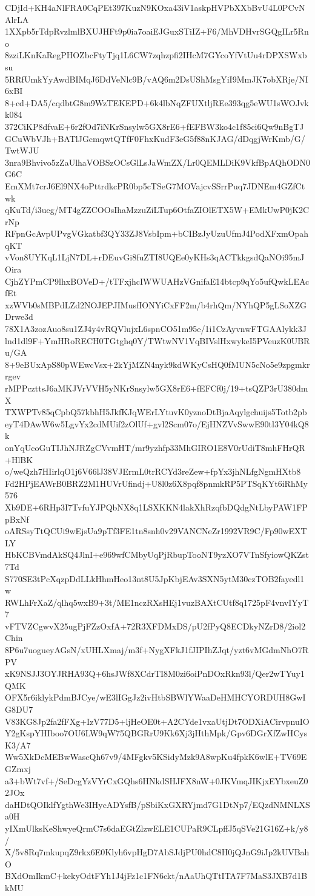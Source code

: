 CDjId+KH4aNlFRA0CqPEt397KuzN9KOxa43iV1askpHVPbXXbBvU4L0PCvNAlrLA
1XXpb5rTdpRvzlmlBXUJHFt9p0ia7oaiEJGuxSTiIZ+F6/MhVDHvrSGQgILr5Rno
8zziLKnKaRegPHOZbcFtyTjq1L6CW7zqhzpfi2IHcM7GYcoYfVtUu4rDPXSWxbsu
5RRfUmkYyAwdBIMqJ6DdVeNlc9B/vAQ6m2DsUShMsgYiI9MmJK7obXRje/NI6xBI
8+cd+DA5/cqdbtG8m9WzTEKEPD+6k4lbNqZFUXtljREe393qg5eWU1sWOJvkk084
372CiKP8dfvaE+6r2fOd7iNKrSnsylw5GX8rE6+fEFBW3ko4c1f85ci6Qw9nBgTJ
GCuWbVJh+BATlJGcmqwtQTfF0FhxKudF3eG5f88nKJAG/dDqgjWrKmb/G/TwtWJU
3nra9Bhvivo5zZaUlhaVOBSzOCsGlLsJaWmZX/Lr0QEMLDiK9VkfBpAQhODN0G6C
EmXMt7crJ6El9NX4oPttrdkcPR0bp5cTSeG7MOVajcvSSrrPuq7JDNEm4GZfCtwk
qKuTd/i3ueg/MT4gZZCOOsIhaMzzuZiLTup6OtfaZIOlETX5W+EMkUwP0jK2CrNp
RFpnGcAvpUPvgVGkatbf3QY33ZJ8VsbIpm+bCIBzJyUzuUfmJ4PodXFxmOpahqKT
vVon8UYKqL1LjN7DL+rDEuvGi8fuZTI8UQEe0yKHs3qACTkkgsdQaNOi95mJOira
CjhZYPmCP9lhxBOVeD+/tTFxjhcIWWUAHzVGnifaE14btcp9qYo5ufQwkLEAcfEt
xzWVb0sMBPdLZd2NOJEPJIMusfIONYiCxFF2m/b4rhQm/NYhQP5gLSoXZGDrwe3d
78X1A3zozAuo8su1ZJ4y4vRQVlujxL6spnCO51m95e/1i1CzAyvnwFTGAAlykk3J
lnd1dl9F+YmHRoRECH0TGtghq0Y/TWtwNV1VqBIVslHxwykeI5PVeuzK0UBRu/GA
8+9eBUxApS80pWEwcVsx+2kYjMZN4nyk9kdWKyCsHQ0fMUN5cNo5e9zpgmkrrgev
rMPPczttsJ6aMKJVrVVH5yNKrSnsylw5GX8rE6+fEFCf0j/19+tsQZP3rU380dmX
TXWPTv85qCpbQ57kbhH5JkfKJqWErLYtuvK0yznoDtBjaAqylgchuijs5Totb2pb
eyT4DAwW6w5LgvYx2cdMUif2zOlUf+gvl2Scm07o/EjHNZVvSwwE90tl3Y04kQ8k
onYqUcoGuTIJhNJRZgCVvmHT/mr9yzhfp33MhGIRO1E8V0rUdiT8mhFHrQR+HlBK
o/weQzh7HIirlqO1j6V66lJ38VJErmL0trRCYd3reZew+fpYx3jhNLfgNgmHXtb8
Fd2HPjEAWrB0BRZ2M1HUVrUfindj+U8l0z6X8pqf8pnmkRP5PTSqKYt6iRhMy576
Xb9DE+6RHp3I7TvfuYJPQbNX8q1LSXKKN4lakXhRzqfbDQdgNtLbyPAW1FPpBxNf
oARSsyTtQCUi9wEjsUa9pTf3FE1tn8snh0v29VANCNeZr1992VR9C/Fp90wEXTLY
HbKCBVmdAkSQ4JlnI+e969wfCMbyUqPjRbupTooNT9yzXO7VTnSfyiowQKZst7Td
S770SE3tPcXqzpDdLLkHhmHeo13nt8U5JpKbjEAv3SXN5ytM30czTOB2fayedl1w
RWLhFrXaZ/qlhq5wxB9+3t/ME1nczRXsHEj1vuzBAXtCUtf8q1725pF4vnvIYyT7
vFTVZCgwvX25ugPjFZzOxfA+72R3XFDMxDS/pU2fPyQ8ECDkyNZrD8/2iol2Chin
8P6u7uogueyAGsN/xUHLXmaj/m3f+NygXFkJ1fJIPIhZJqt/yzt6vMGdmNhO7RPV
xK9NSJJ3OYJRHA93Q+6hsJWf8XCdrTI8M0zi6oiPnDOxRkn93l/Qer2wTYuy1QMK
OFX5r6iklykPdmBJCye/wE3lIGgJz2ivHtbSBWlYWaaDeHMHCYORDUH8GwIG8DU7
V83KG8Jp2fa2fFXg+IzV77D5+ljHeOE0t+A2CYde1vxaUtjDt7ODXiACirvpnuIO
Y2gKspYHIboo7OU6LW9qW75QBGRrU9Kk6Xj3jHthMpk/Gpv6DGrXfZwHCysK3/A7
Ww5XkDcMEBwWascQh67v9/4MFgkv5KSidyMzk9A8wpKu4fpkK6wlE+TV69EGZmxj
a3+bWt7vf+/SeDcgYzVYrCxGQhs6HNkdSHJFX8nW+0JKVmqJIKjxEYbxeuZ02JOx
daHDtQOIklfYgthWe3IHycADYsfB/pSbiKxGXRYjmd7G1DtNp7/EQzdNMNLXSa0H
yIXmUlksKeShwyeQrmC7s6daEGtZlzwELE1CUPaR9CLpffJ5qSVe21G16Z+k/y8/
X/5v8Rq7mkupqZ9rkx6E0Klyh6vpHgD7AbSJdjPU0hdC8H0jQJnG9iJp2kUVBahO
BXdOmIkmC+kekyOdtFYh1J4jFz1c1FN6ckt/nAaUhQTtITA7F7MaS3JXB7d1BkMU

